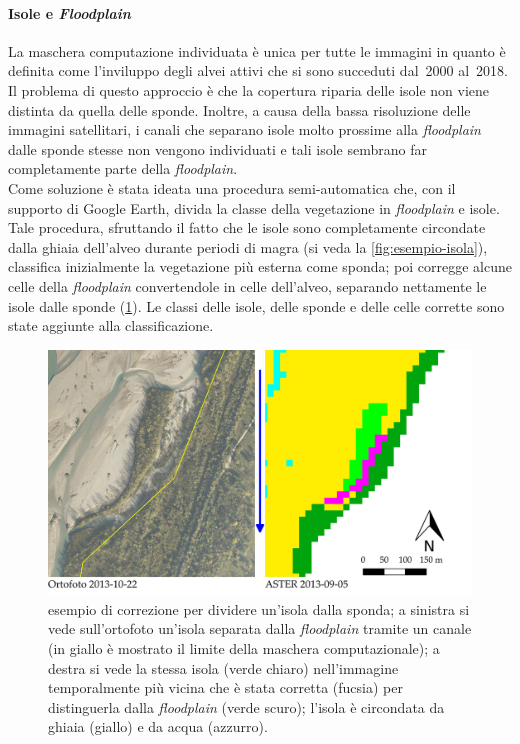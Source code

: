 \paragraph{Isole e \emph{Floodplain}}
La maschera computazione individuata è unica per tutte le immagini in quanto è definita come l'inviluppo degli alvei attivi che si sono succeduti dal~2000 al~2018.
Il problema di questo approccio è che la copertura riparia delle isole non viene distinta da quella delle sponde.
Inoltre, a causa della bassa risoluzione delle immagini satellitari, i canali che separano isole molto prossime alla \emph{floodplain} dalle sponde stesse non vengono individuati e tali isole sembrano far completamente parte della \emph{floodplain}.
\\ 
Come soluzione è stata ideata una procedura semi-automatica che, con il supporto di Google Earth, divida la classe della vegetazione in \emph{floodplain} e isole. 
Tale procedura, sfruttando il fatto che le isole sono completamente circondate dalla ghiaia dell'alveo durante periodi di magra (si veda la \cref{fig:esempio-isola}), classifica inizialmente la vegetazione più esterna come sponda;
poi corregge alcune celle della \emph{floodplain} convertendole in celle dell'alveo, separando nettamente le isole dalle sponde (\cref{fig:isola-divisa-floodplain}).
Le classi delle isole, delle sponde e delle celle corrette sono state aggiunte alla classificazione.
%
\begin{figure}
	\centering
	\includegraphics[width = \textwidth]{files/isola_divisa_floodplain.jpeg}
	\caption[esempio di correzione per dividere un'isola dalla sponda]{esempio di correzione per dividere un'isola dalla sponda; a sinistra si vede sull'ortofoto un'isola separata dalla \emph{floodplain} tramite un canale (in giallo è mostrato il limite della maschera computazionale); a destra si vede la stessa isola (verde chiaro) nell'immagine \AST{} temporalmente più vicina che è stata corretta (fucsia) per distinguerla dalla \emph{floodplain} (verde scuro); l'isola è circondata da ghiaia (giallo) e da acqua (azzurro).}
	\label{fig:isola-divisa-floodplain}
\end{figure}
%
%
%
